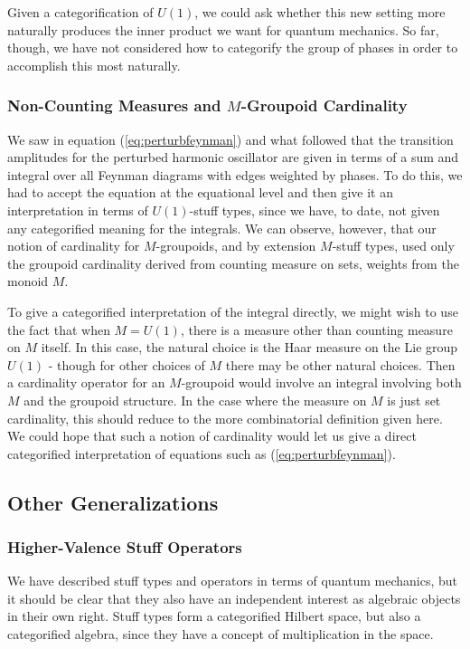 \documentclass{amsart} \usepackage{amsmath,amssymb,bbm}
\begin{document}
Given a categorification of $U(1)$, we could ask whether this new
setting more naturally produces the inner product we want for quantum
mechanics.  So far, though, we have not considered how to categorify
the group of phases in order to accomplish this most naturally.

\subsubsection{Non-Counting Measures and $M$-Groupoid Cardinality}

We saw in equation (\ref{eq:perturbfeynman}) and what followed that
the transition amplitudes for the perturbed harmonic oscillator are
given in terms of a sum and integral over all Feynman diagrams with
edges weighted by phases.  To do this, we had to accept the equation
at the equational level and then give it an interpretation in terms of
$U(1)$-stuff types, since we have, to date, not given any categorified
meaning for the integrals.  We can observe, however, that our notion
of cardinality for $M$-groupoids, and by extension $M$-stuff types,
used only the groupoid cardinality derived from counting measure on
sets, weights from the monoid $M$.

To give a categorified interpretation of the integral directly, we
might wish to use the fact that when $M=U(1)$, there is a measure
other than counting measure on $M$ itself.  In this case, the natural
choice is the Haar measure on the Lie group $U(1)$ - though for other
choices of $M$ there may be other natural choices.  Then a cardinality
operator for an $M$-groupoid would involve an integral involving both
$M$ and the groupoid structure.  In the case where the measure on $M$
is just set cardinality, this should reduce to the more combinatorial
definition given here.  We could hope that such a notion of
cardinality would let us give a direct categorified interpretation of
equations such as (\ref{eq:perturbfeynman}).

\subsection{Other Generalizations}

\subsubsection{Higher-Valence Stuff Operators}

We have described stuff types and operators in terms of quantum
mechanics, but it should be clear that they also have an independent
interest as algebraic objects in their own right.  Stuff types form a
categorified Hilbert space, but also a categorified algebra, since
they have a concept of multiplication in the space.
\end{document}
